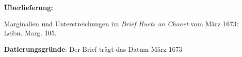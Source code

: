             \begin{ledgroupsized}[r]{120mm}
                \footnotesize 
                \pstart                
                \noindent\textbf{\"{U}berlieferung:}   
                \pend
                \end{ledgroupsized}
                            \begin{ledgroupsized}[r]{114mm}
                            \footnotesize 
                            \pstart \parindent -6mm
                            Marginalien und Unterstreichungen im \cite{00163}\textit{Brief Huets an Chouet} vom M\"{a}rz 1673: Leibn. Marg. 105. \pend
                            \end{ledgroupsized}
                \vspace*{5mm}
                \begin{ledgroup}
                \footnotesize 
                \pstart
            \noindent\footnotesize{\textbf{Datierungsgr\"{u}nde}: Der Brief tr\"{a}gt das Datum M\"{a}rz 1673}
                \pend
                \end{ledgroup}
            

